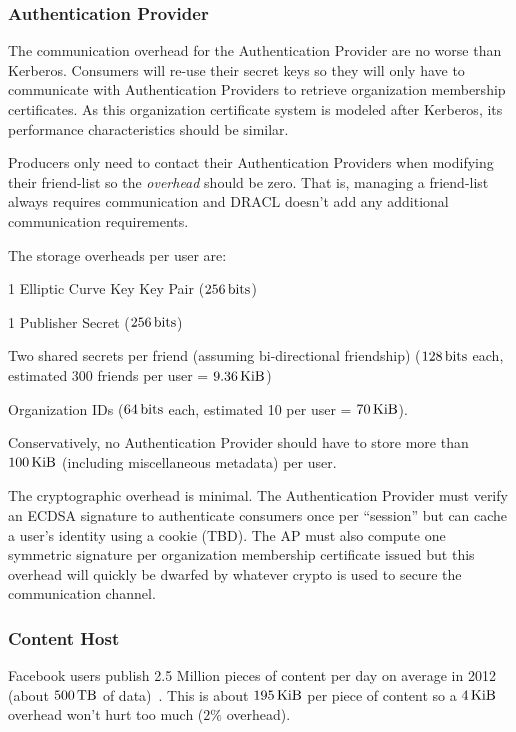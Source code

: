 \documentclass[pdftex,12pt,a4papaer]{article}
\begin{document}
\subsubsection{Authentication Provider}

The communication overhead for the Authentication Provider are no worse than
Kerberos. Consumers will re-use their secret keys so they will only have to
communicate with Authentication Providers to retrieve organization membership
certificates. As this organization certificate system is modeled after Kerberos,
its performance characteristics should be similar.

Producers only need to contact their Authentication Providers when modifying their
friend-list so the \emph{overhead} should be zero. That is, managing a
friend-list always requires communication and DRACL doesn't add any additional
communication requirements.

The storage overheads per user are:

\begin{compactitem}
\item 1 Elliptic Curve Key Key Pair ($\unit[256]{bits}$)
\item 1 Publisher Secret ($\unit[256]{bits}$)
\item Two shared secrets per friend (assuming bi-directional friendship)
    ($\unit[128]{bits}$ each, estimated 300 friends per user = $\unit[9.36]{KiB}$)
\item Organization IDs ($\unit[64]{bits}$ each, estimated 10 per user = $\unit[70]{KiB}$).
\end{compactitem}

Conservatively, no Authentication Provider should have to store more than
$\unit[100]{KiB}$ (including miscellaneous metadata) per user.

The cryptographic overhead is minimal. The Authentication Provider must verify
an ECDSA signature to authenticate consumers once per ``session'' but can cache
a user's identity using a cookie (TBD). The AP must also compute one symmetric
signature per organization membership certificate issued but this overhead will
quickly be dwarfed by whatever crypto is used to secure the communication
channel.

\subsubsection{Content Host}

Facebook users publish 2.5 Million pieces of content per day on average in 2012
(about $\unit[500]{TB}$ of data)~\cite{fbnum}. This is about $\unit[195]{KiB}$
per piece of content so a $\unit[4]{KiB}$ overhead won't hurt too much ($2\%$
overhead).
\end{document}
